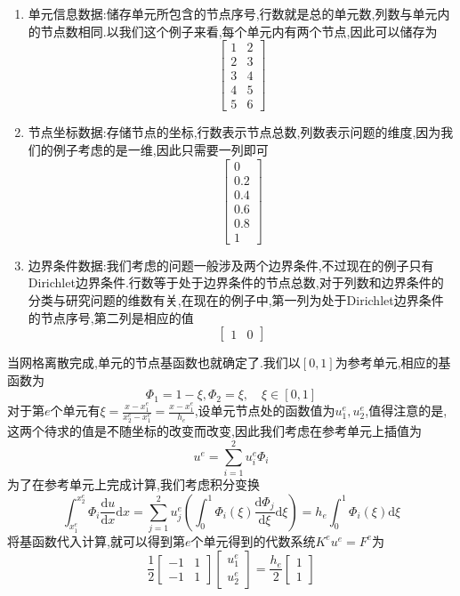 \begin{enumerate}[nosep]
    \item 单元信息数据:储存单元所包含的节点序号,行数就是总的单元数,列数与单元内的节点数相同.以我们这个例子来看,每个单元内有两个节点,因此可以储存为
    $$
    \begin{bmatrix}
        1 & 2\\
        2 & 3\\
        3 & 4\\
        4 & 5\\
        5 & 6
    \end{bmatrix}
    $$
    \item 节点坐标数据:存储节点的坐标,行数表示节点总数,列数表示问题的维度,因为我们的例子考虑的是一维,因此只需要一列即可
    $$
    \begin{bmatrix}
        0\\
        0.2\\
        0.4\\
        0.6\\
        0.8\\
        1
    \end{bmatrix}
    $$
    \item 边界条件数据:我们考虑的问题一般涉及两个边界条件,不过现在的例子只有Dirichlet边界条件.行数等于处于边界条件的节点总数,对于列数和边界条件的分类与研究问题的维数有关,在现在的例子中,第一列为处于Dirichlet边界条件的节点序号,第二列是相应的值
    $$
    \begin{bmatrix}
        1 & 0
    \end{bmatrix}
    $$
\end{enumerate}
当网格离散完成,单元的节点基函数也就确定了.我们以$[0,1]$为参考单元,相应的基函数为
$$
\Phi_1 = 1-\xi,\Phi_2 = \xi,\quad \xi\in [0,1]
$$
对于第$e$个单元有$\xi=\frac{x-x_1^e}{x_2^e-x_1^e}=\frac{x-x_1^e}{h_e}$,设单元节点处的函数值为$u_1^e,u_2^e$,值得注意的是,这两个待求的值是不随坐标的改变而改变,因此我们考虑在参考单元上插值为
$$
u^e=\sum_{i=1}^{2}u^e_i\Phi_i
$$
为了在参考单元上完成计算,我们考虑积分变换
$$
\int_{x_1^e}^{x_2^e}\Phi_i\frac{\mathrm{d}u}{\mathrm{d}x}\mathrm{d}x=\sum_{j=1}^{2}u_j^e\left(\int_0^1\Phi_i(\xi)\frac{\mathrm{d}\Phi_j}{\mathrm{d}\xi}\mathrm{d}\xi\right)=h_e\int_0^1\Phi_i(\xi)\mathrm{d}\xi
$$
将基函数代入计算,就可以得到第$e$个单元得到的代数系统$K^eu^e=F^e$为
$$
\frac{1}{2}
\begin{bmatrix}
    -1 & 1\\
    -1 & 1
\end{bmatrix}
\begin{bmatrix}
    u^e_1\\
    u^e_2
\end{bmatrix}
=
\frac{h_e}{2}
\begin{bmatrix}
    1\\
    1
\end{bmatrix}
$$












